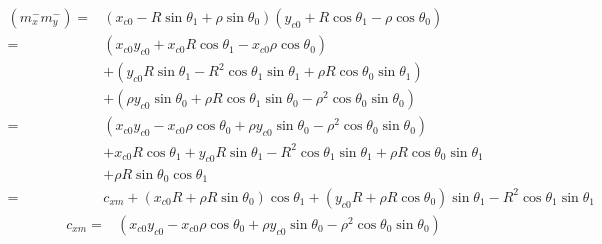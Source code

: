 \documentclass[12pt]{article}
\begin{document}
\begin{align}
    (m_x^-m_y^-) =& (x_{c0} -R\sin\theta_1 +\rho\sin\theta_0)( y_{c0} + R\cos\theta_1 - \rho\cos\theta_0 )\\
    =& ( x_{c0}y_{c0} + x_{c0}R\cos\theta_1 - x_{c0}\rho\cos\theta_0 ) \nonumber\\
    &+ (y_{c0}R\sin\theta_1 - R^2\cos\theta_1\sin\theta_1 + \rho R\cos\theta_0\sin\theta_1 ) \nonumber\\
    &+ ( \rho y_{c0}\sin\theta_0 + \rho R\cos\theta_1\sin\theta_0 - \rho^2\cos\theta_0\sin\theta_0)\\
    =&  ( x_{c0}y_{c0} - x_{c0}\rho\cos\theta_0 +  \rho y_{c0}\sin\theta_0 - \rho^2\cos\theta_0\sin\theta_0 )  \nonumber\\
    &+ x_{c0}R\cos\theta_1 + y_{c0}R\sin\theta_1 - R^2\cos\theta_1\sin\theta_1 + \rho R\cos\theta_0\sin\theta_1  \nonumber\\
    & + \rho R\sin\theta_0\cos\theta_1\\
    =&  c_{xm} + (x_{c0}R + \rho R\sin\theta_0)\cos\theta_1 + (y_{c0}R + \rho R\cos\theta_0)\sin\theta_1 - R^2\cos\theta_1\sin\theta_1
\end{align}
\begin{align}
    c_{xm} =& ( x_{c0}y_{c0} - x_{c0}\rho\cos\theta_0 +  \rho y_{c0}\sin\theta_0 - \rho^2\cos\theta_0\sin\theta_0 )
\end{align}
\end{document}
